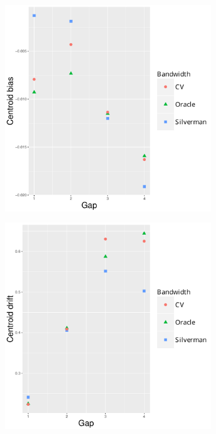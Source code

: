 \begin{figure}[htbp]
\begin{subfigure}[b]{0.24\textwidth}
        \caption{}
        \label{fig:other_measures:p1.4_100_G:peak_drift}
    \end{subfigure}
    \begin{subfigure}[b]{0.24\textwidth}
        \includegraphics[width=\textwidth]{results/by_two_peaks/centroid-bias-vs-risk-peak-gap}
        \caption{}
        \label{fig:other_measures:p1.4_100_G:centroid_bias}
    \end{subfigure}
    \begin{subfigure}[b]{0.24\textwidth}
        \includegraphics[width=\textwidth]{results/by_two_peaks/centroid-drift-vs-risk-peak-gap}

\end{subfigure}
\end{figure}
